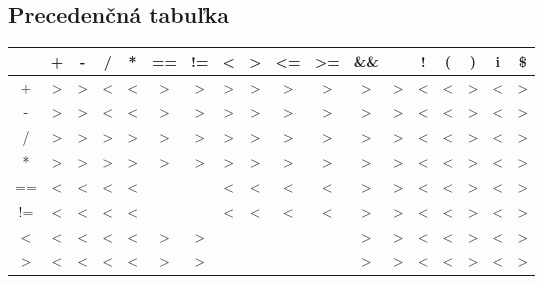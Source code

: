 \documentclass[11pt,a4paper]{article}
\begin{document}
	\subsection{Precedenčná tabuľka}
	\label{tabulka}
	\begin{tabular}{|c|c|c|c|c|c|c|c|c|c|c|c|c|c|c|c|c|c|}
		\hline
		& + & - & / & * & ==& !=& \textless & \textgreater & \textless = & \textgreater = & \&\& & \textbar \textbar & ! & ( & ) & i & \$
		\\ \hline
		+  & \textgreater & \textgreater & \textless & \textless & \textgreater & \textgreater & \textgreater & \textgreater & \textgreater & \textgreater & \textgreater & \textgreater & \textless & \textless & \textgreater & \textless & \textgreater
		\\ \hline
		-  & \textgreater & \textgreater & \textless & \textless & \textgreater & \textgreater & \textgreater & \textgreater & \textgreater & \textgreater & \textgreater & \textgreater & \textless & \textless & \textgreater & \textless & \textgreater
		\\ \hline
		/  & \textgreater & \textgreater & \textgreater & \textgreater & \textgreater & \textgreater & \textgreater & \textgreater & \textgreater & \textgreater & \textgreater & \textgreater & \textless & \textless & \textgreater & \textless & \textgreater
		\\ \hline
		*  & \textgreater & \textgreater & \textgreater & \textgreater & \textgreater & \textgreater & \textgreater & \textgreater & \textgreater & \textgreater & \textgreater & \textgreater & \textless & \textless & \textgreater & \textless & \textgreater
		\\ \hline
		== & \textless & \textless & \textless & \textless &   &   & \textless & \textless & \textless & \textless & \textgreater & \textgreater & \textless & \textless & \textgreater & \textless & \textgreater
		\\ \hline
		!= & \textless & \textless & \textless & \textless &   &   & \textless & \textless & \textless & \textless & \textgreater & \textgreater & \textless & \textless & \textgreater & \textless & \textgreater
		\\ \hline
		\textless  & \textless & \textless & \textless & \textless & \textgreater & \textgreater &   &   &   &   & \textgreater & \textgreater & \textless & \textless & \textgreater & \textless & \textgreater
		\\ \hline
		\textgreater  & \textless & \textless & \textless & \textless & \textgreater & \textgreater &   &   &   &   & \textgreater & \textgreater & \textless & \textless & \textgreater & \textless & \textgreater

\end{tabular}
\end{document}
